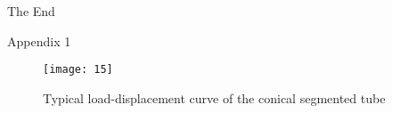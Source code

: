 \documentclass{beamer}
\begin{document}
	
	\begin{frame}
		\Huge{\centerline{The End}}
	\end{frame}
	
	
	\appendix
	\begin{frame}{Appendix 1}	
		\hypertarget{1}{}

		\begin{figure}[H]%
			\centering
			\texttt{[image: 15]}
			\caption{\tiny Typical load-displacement curve of the conical segmented tube}\label{nemE}
		\end{figure}
		
		
	\end{frame}
\end{document}

